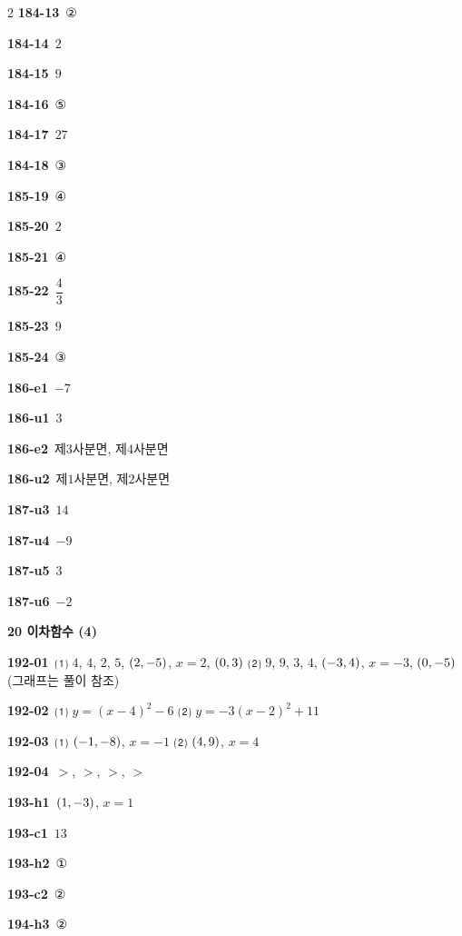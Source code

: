 \documentclass[10pt,a4paper]{article}
\begin{document}
\begin{multicols}{2}
\noindent\textbf{184-13}\ ②\par
\noindent\textbf{184-14}\ $2$\par
\noindent\textbf{184-15}\ $9$\par
\noindent\textbf{184-16}\ ⑤\par
\noindent\textbf{184-17}\ $27$\par
\noindent\textbf{184-18}\ ③\par
\noindent\textbf{185-19}\ ④\par
\noindent\textbf{185-20}\ $2$\par
\noindent\textbf{185-21}\ ④\par
\noindent\textbf{185-22}\ $\dfrac{4}{3}$\par
\noindent\textbf{185-23}\ $9$\par
\noindent\textbf{185-24}\ ③\par
\noindent\textbf{186-e1}\ $-7$\par
\noindent\textbf{186-u1}\ $3$\par
\noindent\textbf{186-e2}\ 제$3$사분면, 제$4$사분면\par
\noindent\textbf{186-u2}\ 제$1$사분면, 제$2$사분면\par
\noindent\textbf{187-u3}\ $14$\par
\noindent\textbf{187-u4}\ $-9$\par
\noindent\textbf{187-u5}\ $3$\par
\noindent\textbf{187-u6}\ $-2$\par
\noindent\textbf{20 이차함수 (4)}\par\smallskip
\noindent\textbf{192-01}\ ⑴ $4$, $4$, $2$, $5$, $(2{,}\mkern3mu\mathopen{}-5)$, $x=2$, $(0{,}\mkern3mu\mathopen{}3)$ ⑵ $9$, $9$, $3$, $4$, $(-3{,}\mkern3mu\mathopen{}4)$, $x=-3$, $(0{,}\mkern3mu\mathopen{}-5)$ (그래프는 풀이 참조)\par
\noindent\textbf{192-02}\ ⑴ $y=(x-4)^2-6$ ⑵ $y=-3(x-2)^2+11$\par
\noindent\textbf{192-03}\ ⑴ $(-1{,}\mkern3mu\mathopen{}-8)$, $x=-1$ ⑵ $(4{,}\mkern3mu\mathopen{}9)$, $x=4$\par
\noindent\textbf{192-04}\ $>$, $>$, $>$, $>$\par
\noindent\textbf{193-h1}\ $(1{,}\mkern3mu\mathopen{}-3)$, $x=1$\par
\noindent\textbf{193-c1}\ $13$\par
\noindent\textbf{193-h2}\ ①\par
\noindent\textbf{193-c2}\ ②\par
\noindent\textbf{194-h3}\ ②\par

\end{multicols}
\end{document}
